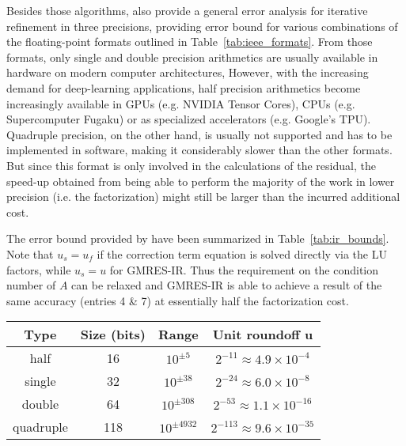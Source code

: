 Besides those algorithms, \cite{carson_accelerating_2018} also provide a general error analysis for iterative refinement in three precisions, providing error bound for various combinations of the floating-point formats outlined in Table~\hyperref[tab:ieee_formats]{\ref{tab:ieee_formats}}. From those formats, only single and double precision arithmetics are usually available in hardware on modern computer architectures, However, with the increasing demand for deep-learning applications, half precision arithmetics become increasingly available in GPUs (e.g. NVIDIA Tensor Cores), CPUs (e.g. Supercomputer Fugaku) or as specialized accelerators (e.g. Google's TPU). Quadruple precision, on the other hand, is usually not supported and has to be implemented in software, making it considerably slower than the other formats. But since this format is only involved in the calculations of the residual, the speed-up obtained from being able to perform the majority of the work in lower precision (i.e. the factorization) might still be larger than the incurred additional cost.

The error bound provided by \cite{carson_accelerating_2018} have been summarized in Table~\hyperref[tab:ir_bounds]{\ref{tab:ir_bounds}}. Note that $u_s = u_f$ if the correction term equation is solved directly via the LU factors, while $u_s=u$ for GMRES-IR. Thus the requirement on the condition number of $A$ can be relaxed and GMRES-IR is able to achieve a result of the same accuracy (entries 4 \& 7) at essentially half the factorization cost.

\begin{table*}[h]
\setlength{\tabcolsep}{10pt} %
  \begin{center}
    \begin{tabular}{c  c  c  c}
     \textbf{Type} & \textbf{Size} (bits) & \textbf{Range} & \textbf{Unit roundoff $\bm{u}$}\\
     \toprule
    half & 16 & $10^{\pm5}$ & $2^{-11}\approx 4.9 \times 10^{-4}$ \\
    single & 32 & $10^{\pm38}$ & $2^{-24}\approx 6.0 \times 10^{-8}$ \\
    double & 64 & $10^{\pm308}$ & $2^{-53}\approx 1.1 \times 10^{-16}$ \\
    quadruple & 118 & $10^{\pm4932}$ & $2^{-113}\approx 9.6 \times 10^{-35}$\\
    \end{tabular}
        \caption[IEEE Arithmetic Precisions]{Arithmetic precisions for IEEE floating-point formats.}
    \label{tab:ieee_formats}
  \end{center}
\end{table*}


